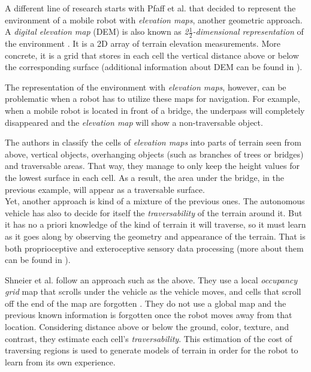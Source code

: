 \documentclass[12pt,a4paper]{report}
\newcommand{\term}{\textit}
\newcommand{\acronym}{\MakeUppercase}
\newcommand{\itfrac}[2]{\frac{\textit{#1}}{\textit{#2}}}
\begin{document}
	
	A different line of research starts with Pfaff et al. that decided to represent 
	the environment of a mobile robot with \term{elevation maps}, another geometric 
	approach. A \term{digital elevation map} (\acronym{dem}) is also known as 
	\term{2\(\itfrac{1}{2}\)-dimensional representation} of the environment 
	\cite{Pfaff}. It is a \acronym{2d} array of terrain elevation measurements. More 
	concrete, it is a grid that stores in each cell the vertical distance above or 
	below the corresponding surface (additional information about \acronym{dem} can 
	be found in \cite{Kweon}). 
	\par 
	The representation of the environment with \term{elevation maps}, however, can 
	be problematic when a robot has to utilize these maps for navigation. For 
	example, when a mobile robot is located in front of a bridge, the underpass will 
	completely disappeared and the \term{elevation map} will show a non-traversable 
	object.
	\par
	The authors in \cite{Pfaff} classify the cells of \term{elevation maps} into 
	parts of terrain seen from above, vertical objects,	overhanging objects (such as 
	branches of trees or bridges) and traversable areas. That way, they manage to 
	only keep the height values for the lowest surface in each cell. As a result, 
	the area under the bridge, in the previous example, will appear as a traversable 
	surface.
	\\
	
	Yet, another approach is kind of a mixture of the previous ones. The autonomous 
	vehicle has also to decide for itself the \term{traversability} of the terrain 
	around it. But it has no a priori knowledge of the kind of terrain it will 
	traverse, so it must learn as it goes along by observing the geometry and 
	appearance of the terrain. That is both proprioceptive and exteroceptive sensory 
	data processing (more about them can be found in \cite{Papadakis}). 
	\par
	Shneier et al. follow an approach such as the above. They use a local 
	\term{occupancy grid} map that scrolls under the vehicle as the vehicle moves,
	and cells that scroll off the end of the map are forgotten \cite{Shneier}. They 
	do not use a global map and the previous known information is forgotten once the 
	robot moves away from that location. Considering distance above or below the 
	ground, color, texture, and contrast, they estimate each cell’s 
	\term{traversability}. This estimation of the cost of traversing regions is used 
	to generate models of terrain in order for the robot to learn from its own 
	experience.
	\\
	
\end{document}
